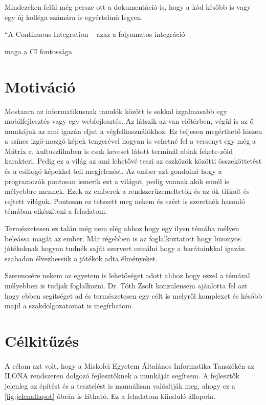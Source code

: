 Mindezeken felül még persze ott a dokumentáció is, hogy a kód később is vagy egy új kolléga számára is egyértelmű legyen.

“A Continuous Integration – azaz a folyamatos integráció

maga a CI fontossága
\pagebreak
\section{Motiváció}

Mostanra az informatikusnak tanulók között is sokkal izgalmasabb egy mobilfejlesztés vagy egy webfejlesztés.
Az látszik az van előtérben, végül is az ő munkájuk az ami igazán eljut a végfelhasználókhoz.
Ez teljesen megérthető hiszen a színes izgő-mozgó képek tengerével hogyan is vehetné fel a versenyt egy még a Mátrix c. kultuszfilmben is csak keveset látott terminál ablak fekete-zöld karakteri.
Pedig ez a világ az ami lehetővé teszi az eszközök közötti összeköttetést és a csillogó képekkel teli megjelenést.
Az ember azt gondolná hogy a programozók pontosan ismerik ezt a világot, pedig vannak akik ennél is mélyebbre mennek.
Ezek az emberek a rendszerüzemeltetők és az ők titkolt és rejtett világuk.
Pontosan ez tetszett meg nekem és ezért is szeretnék hasonló témában elkészíteni a feladatom.


Természetesen ez talán még nem elég ahhoz hogy egy ilyen témába mélyen beleássa  magát az ember.
Már régebben is az foglalkoztatott hogy bizonyos játékoknak hogyan tudnék saját szervert csinálni hogy a barátainkkal igazán szabadon élvezhessük a játékok adta élményeket.

Szerencsére nekem az egyetem is lehetőséget adott ahhoz hogy ezzel a témával mélyebben is tudjak foglalkozni.
Dr. Tóth Zsolt konzulensem ajánlotta fel azt hogy ebben segítséget ad és természetesen egy célt is melyről komplexet és később majd a szakdolgozatomat is megírhatom.


\pagebreak
\section{Célkitűzés}
\paragraph{}
A célom azt volt, hogy a Miskolci Egyetem Általános Informatika Tanszékén az ILONA rendszeren dolgozó fejlesztőknek a munkáját segítsem. 
A fejlesztők jelenleg az építést és a tesztelést is manuálisan valósítják meg, ahogy ez a \ref{fig:jelenallapot} ábrán is látható. Ez a feladatom kiinduló állapota. 

